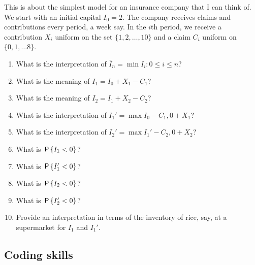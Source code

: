 \documentclass[assignments]{subfiles}
\begin{document}
\begin{exercise}
This is about the simplest model for an insurance company that I can think of.
We start with an initial capital $I_0=2$.
The company receives claims and contributions every period, a week say.
In the $i$th period, we receive a contribution $X_{i}$ uniform on the set $\{1, 2,\ldots,10\}$ and a claim $C_i$ uniform on $\{0, 1, \ldots 8\}$.
\begin{enumerate}
\item What is the interpretation of $\bar I_{n} = \min{I_{i} : 0\leq i\leq n}$?
\item What is the meaning of $I_1=I_0+X_1-C_1$?
\item What is the meaning of $I_2=I_1+X_2-C_2$?
\item What is the interpretation of $I_1'=\max{I_0-C_1,0} + X_1$?
\item What is the interpretation of $I_2'=\max{I_1'-C_2,0} + X_2$?
\item What is  $\P{I_1 < 0}$?
\item What is  $\P{I_1' < 0}$?
\item What is  $\P{I_2 < 0}$?
\item What is  $\P{I_2' < 0}$?
\item Provide an interpretation in terms of the inventory of rice, say, at a supermarket for $I_{1}$ and $I_{1}'$.
\end{enumerate}
\end{exercise}

\subsection{Coding skills}
\label{sec:coding-skills}
\end{document}
